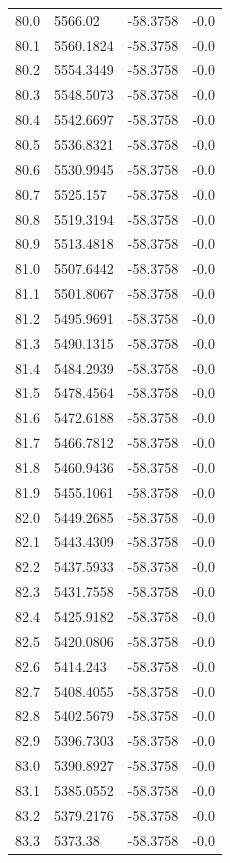 \begin{table}[H]
\begin{tabular}{llll}
80.0 & 5566.02 & -58.3758 & -0.0 \\
80.1 & 5560.1824 & -58.3758 & -0.0 \\
80.2 & 5554.3449 & -58.3758 & -0.0 \\
80.3 & 5548.5073 & -58.3758 & -0.0 \\
80.4 & 5542.6697 & -58.3758 & -0.0 \\
80.5 & 5536.8321 & -58.3758 & -0.0 \\
80.6 & 5530.9945 & -58.3758 & -0.0 \\
80.7 & 5525.157 & -58.3758 & -0.0 \\
80.8 & 5519.3194 & -58.3758 & -0.0 \\
80.9 & 5513.4818 & -58.3758 & -0.0 \\
81.0 & 5507.6442 & -58.3758 & -0.0 \\
81.1 & 5501.8067 & -58.3758 & -0.0 \\
81.2 & 5495.9691 & -58.3758 & -0.0 \\
81.3 & 5490.1315 & -58.3758 & -0.0 \\
81.4 & 5484.2939 & -58.3758 & -0.0 \\
81.5 & 5478.4564 & -58.3758 & -0.0 \\
81.6 & 5472.6188 & -58.3758 & -0.0 \\
81.7 & 5466.7812 & -58.3758 & -0.0 \\
81.8 & 5460.9436 & -58.3758 & -0.0 \\
81.9 & 5455.1061 & -58.3758 & -0.0 \\
82.0 & 5449.2685 & -58.3758 & -0.0 \\
82.1 & 5443.4309 & -58.3758 & -0.0 \\
82.2 & 5437.5933 & -58.3758 & -0.0 \\
82.3 & 5431.7558 & -58.3758 & -0.0 \\
82.4 & 5425.9182 & -58.3758 & -0.0 \\
82.5 & 5420.0806 & -58.3758 & -0.0 \\
82.6 & 5414.243 & -58.3758 & -0.0 \\
82.7 & 5408.4055 & -58.3758 & -0.0 \\
82.8 & 5402.5679 & -58.3758 & -0.0 \\
82.9 & 5396.7303 & -58.3758 & -0.0 \\
83.0 & 5390.8927 & -58.3758 & -0.0 \\
83.1 & 5385.0552 & -58.3758 & -0.0 \\
83.2 & 5379.2176 & -58.3758 & -0.0 \\
83.3 & 5373.38 & -58.3758 & -0.0 \\

\end{tabular}
\end{table}
